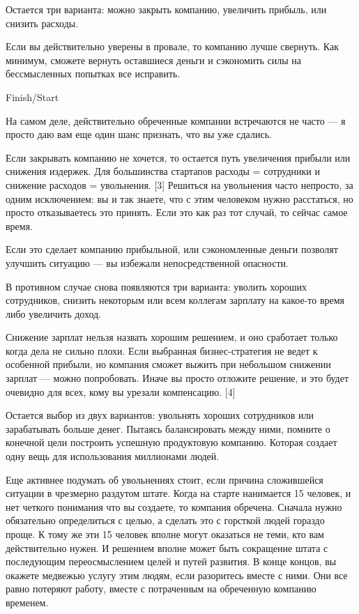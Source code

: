 \documentclass[ebook,12pt,oneside,openany]{memoir}
\begin{document}
Остается три варианта: можно закрыть компанию, увеличить прибыль, или
снизить расходы.

Если вы действительно уверены в провале, то компанию лучше свернуть.
Как минимум, сможете вернуть оставшиеся деньги и сэкономить силы на
бессмысленных попытках все исправить.

Finish/Start


На самом деле, действительно обреченные компании встречаются не часто
— я просто даю вам еще один шанс признать, что вы уже сдались.

Если закрывать компанию не хочется, то остается путь увеличения
прибыли или снижения издержек. Для большинства стартапов расходы =
сотрудники и снижение расходов = увольнения. [3] Решиться на
увольнения часто непросто, за одним исключением: вы и так знаете, что
с этим человеком нужно расстаться, но просто отказываетесь это
принять. Если это как раз тот случай, то сейчас самое время.

Если это сделает компанию прибыльной, или сэкономленные деньги
позволят улучшить ситуацию — вы избежали непосредственной опасности.

В противном случае снова появляются три варианта: уволить хороших
сотрудников, снизить некоторым или всем коллегам зарплату на какое-то
время либо увеличить доход.

Снижение зарплат нельзя назвать хорошим решением, и оно сработает
только когда дела не сильно плохи. Если выбранная бизнес-стратегия не
ведет к особенной прибыли, но компания сможет выжить при небольшом
снижении зарплат — можно попробовать. Иначе вы просто отложите
решение, и это будет очевидно для всех, кому вы урезали компенсацию.
[4]

Остается выбор из двух вариантов: увольнять хороших сотрудников или
зарабатывать больше денег. Пытаясь балансировать между ними, помните о
конечной цели построить успешную продуктовую компанию. Которая создает
одну вещь для использования миллионами людей.

Еще активнее подумать об увольнениях стоит, если причина сложившейся
ситуации в чрезмерно раздутом штате. Когда на старте нанимается 15
человек, и нет четкого понимания что вы создаете, то компания
обречена. Сначала нужно обязательно определиться с целью, а сделать
это с горсткой людей гораздо проще. К тому же эти 15 человек вполне
могут оказаться не теми, кто вам действительно нужен. И решением
вполне может быть сокращение штата с последующим переосмыслением целей
и путей развития. В конце концов, вы окажете медвежью услугу этим
людям, если разоритесь вместе с ними. Они все равно потеряют работу,
вместе с потраченным на обреченную компанию временем.
\end{document}
